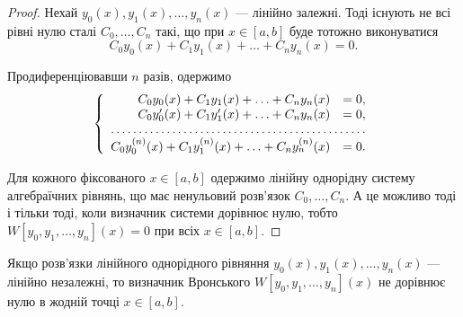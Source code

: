 \begin{proof}
	Нехай $y_0(x), y_1(x), \ldots, y_n(x)$ --- лінійно залежні. Тоді існують не всі рівні нулю сталі $C_0, \ldots, C_n$ такі, що при $x \in [a,b]$ буде тотожно виконуватися
	\begin{equation*}
		C_0 y_0(x) + C_1 y_1(x) + \ldots + C_n y_n(x) = 0.
	\end{equation*}
	
	Продиференціювавши $n$ разів, одержимо 
	\begin{equation*}
		\left\{ \begin{array}{rl}
			C_0 y_0(x) + C_1 y_1(x) + \ldots + C_n y_n(x) &= 0, \\
			C_0 y_0'(x) + C_1 y_1'(x) + \ldots + C_n y_n(x) &= 0, \\
			\hdotsfor{2} \\
			C_0 y_0^{(n)}(x) + C_1 y_1^{(n)}(x) + \ldots + C_n y_n^{(n)}(x) &= 0.
		\end{array} \right.
	\end{equation*}
 
	Для кожного фіксованого $x \in [a,b]$ одержимо лінійну однорідну систему алгебраїчних рівнянь, що має ненульовий розв'язок $C_0, \ldots, C_n$. А це можливо тоді і тільки тоді, коли визначник системи дорівнює нулю, тобто $W[y_0, y_1, \ldots, y_n](x) = 0$ при всіх $x \in [a,b]$.
\end{proof}

\begin{theorem}
	Якщо розв'язки лінійного однорідного рівняння $y_0(x), y_1(x), \ldots, y_n(x)$ --- лінійно незалежні, то визначник Вронського $W[y_0, y_1, \ldots, y_n](x)$ не дорівнює нулю в жодній точці $x \in [a,b]$.
\end{theorem} 

